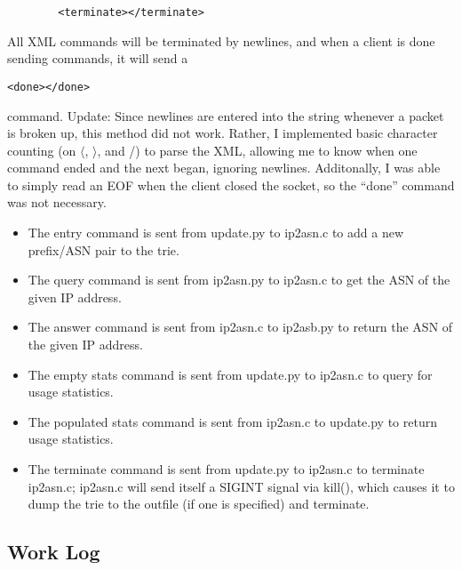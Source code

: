 \documentclass[letterpaper,10pt,fleqn]{article}
\numberwithin{equation}{section}
\begin{document}
\begin{itemize}
\begin{verbatim}
        <terminate></terminate>
    \end{verbatim}
    All XML commands will be terminated by newlines, and when a client is done sending commands, it will send a \begin{verbatim}<done></done>\end{verbatim} command.  Update: Since newlines are entered into the string whenever a packet is broken up, this method did not work.  Rather, I implemented basic character counting (on \(\langle\), \(\rangle\), and /) to parse the XML, allowing me to know when one command ended and the next began, ignoring newlines.  Additonally, I was able to simply read an EOF when the client closed the socket, so the ``done'' command was not necessary.
    \begin{itemize}
        \item The entry command is sent from update.py to ip2asn.c to add a new prefix/ASN pair to the trie.
        \item The query command is sent from ip2asn.py to ip2asn.c to get the ASN of the given IP address.
        \item The answer command is sent from ip2asn.c to ip2asb.py to return the ASN of the given IP address.
        \item The empty stats command is sent from update.py to ip2asn.c to query for usage statistics.
        \item The populated stats command is sent from ip2asn.c to update.py to return usage statistics.
        \item The terminate command is sent from update.py to ip2asn.c to terminate ip2asn.c; ip2asn.c will send itself a SIGINT signal via kill(), which causes it to dump the trie to the outfile (if one is specified) and terminate.
    \end{itemize}
\end{itemize}

\subsection*{Work Log}
\begin{verbatim}
\end{verbatim}
\end{document}
